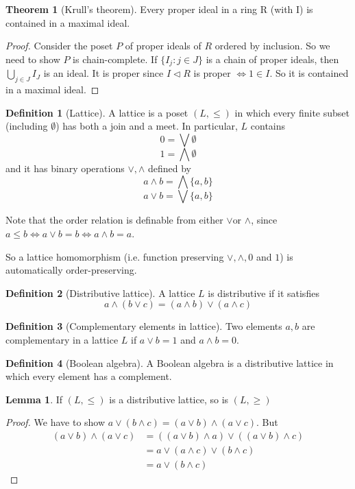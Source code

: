 \documentclass[a4paper]{article}
\theoremstyle{definition}
\newtheorem*{thm}{Theorem}
\newtheorem*{defi}{Definition}
\newtheorem*{lemma}{Lemma}
\begin{document}
\begin{thm}[Krull's theorem]
  Every proper ideal in a ring R (with I) is contained in a maximal ideal.
\end{thm}

\begin{proof}
  Consider the poset $P$ of proper ideals of $R$ ordered by inclusion. So we need to show $P$ is chain-complete. If $\{I_j: j\in J\}$ is a chain of proper ideals, then $\bigcup_{j\in J}I_J$ is an ideal. It is proper since $I\lhd R$ is proper $\Leftrightarrow 1\in I$. So it is contained in a maximal ideal.
\end{proof}

\begin{defi}[Lattice]
  A lattice is a poset $(L, \leq)$ in which every finite subset (including $\emptyset$) has both a join and a meet. In particular, $L$ contains
$$0 = \bigvee \emptyset$$
$$1 = \bigwedge \emptyset$$
and it has binary operations $\vee, \wedge$ defined by
$$a\wedge b = \bigwedge\{a, b\}$$
$$a\vee b = \bigvee \{a, b\}$$

Note that the order relation is definable from either $\vee $or $\wedge$, since $a\leq b\Leftrightarrow a\vee b = b \Leftrightarrow a\wedge b = a$.

So a lattice homomorphism (i.e. function preserving $\vee, \wedge, 0$ and $1$) is automatically order-preserving.
\end{defi}

\begin{defi}[Distributive lattice]
  A lattice $L$ is distributive if it satisfies
$$a\wedge (b\vee c) = (a\wedge b)\vee (a\wedge c)$$
\end{defi}

\begin{defi}[Complementary elements in lattice]
  Two elements $a, b$ are complementary in a lattice $L$ if $a\vee b = 1$ and $a\wedge b = 0$.
\end{defi}

\begin{defi}[Boolean algebra]
  A Boolean algebra is a distributive lattice in which every element has a complement.
\end{defi}

\begin{lemma}
  If $(L, \leq)$ is a distributive lattice, so is $(L, \geq)$
\end{lemma}

\begin{proof}
  We have to show $a\vee (b\wedge c) = (a\vee b)\wedge(a\vee c)$. But
  \begin{align*}
    (a\vee b)\wedge(a\vee c) &= ((a\vee b)\wedge a)\vee ((a\vee b)\wedge c)\\
    &= a\vee (a\wedge c)\vee (b\wedge c)\\
    &= a\vee (b\wedge c)
  \end{align*}
\end{proof}
\end{document}
